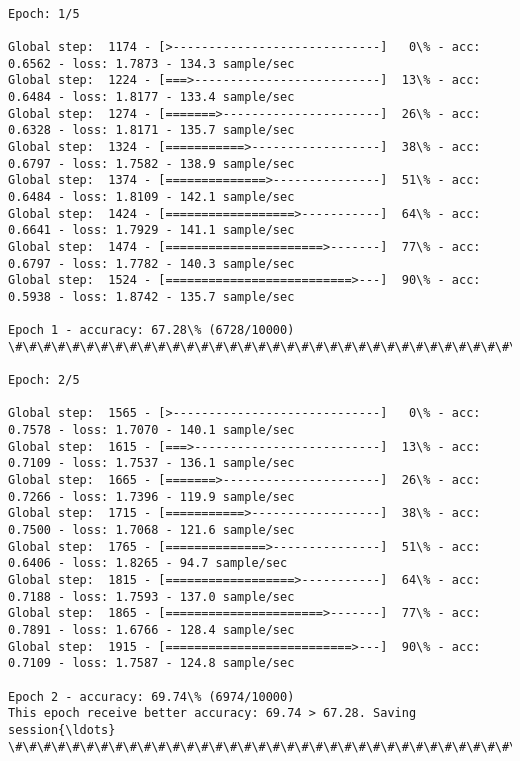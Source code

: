 \documentclass[11pt]{article}
\begin{document}
    \begin{Verbatim}[commandchars=\\\{\}]

Epoch: 1/5

Global step:  1174 - [>-----------------------------]   0\% - acc: 0.6562 - loss: 1.7873 - 134.3 sample/sec
Global step:  1224 - [===>--------------------------]  13\% - acc: 0.6484 - loss: 1.8177 - 133.4 sample/sec
Global step:  1274 - [=======>----------------------]  26\% - acc: 0.6328 - loss: 1.8171 - 135.7 sample/sec
Global step:  1324 - [===========>------------------]  38\% - acc: 0.6797 - loss: 1.7582 - 138.9 sample/sec
Global step:  1374 - [==============>---------------]  51\% - acc: 0.6484 - loss: 1.8109 - 142.1 sample/sec
Global step:  1424 - [==================>-----------]  64\% - acc: 0.6641 - loss: 1.7929 - 141.1 sample/sec
Global step:  1474 - [======================>-------]  77\% - acc: 0.6797 - loss: 1.7782 - 140.3 sample/sec
Global step:  1524 - [==========================>---]  90\% - acc: 0.5938 - loss: 1.8742 - 135.7 sample/sec

Epoch 1 - accuracy: 67.28\% (6728/10000)
\#\#\#\#\#\#\#\#\#\#\#\#\#\#\#\#\#\#\#\#\#\#\#\#\#\#\#\#\#\#\#\#\#\#\#\#\#\#\#\#\#\#\#\#\#\#\#\#\#\#\#\#\#\#\#\#\#\#\#\#\#\#\#\#\#\#\#\#\#\#\#\#\#\#\#\#\#\#\#\#\#\#\#\#\#\#\#\#\#\#\#\#\#\#\#\#\#\#\#\#\#\#\#\#\#\#\#

Epoch: 2/5

Global step:  1565 - [>-----------------------------]   0\% - acc: 0.7578 - loss: 1.7070 - 140.1 sample/sec
Global step:  1615 - [===>--------------------------]  13\% - acc: 0.7109 - loss: 1.7537 - 136.1 sample/sec
Global step:  1665 - [=======>----------------------]  26\% - acc: 0.7266 - loss: 1.7396 - 119.9 sample/sec
Global step:  1715 - [===========>------------------]  38\% - acc: 0.7500 - loss: 1.7068 - 121.6 sample/sec
Global step:  1765 - [==============>---------------]  51\% - acc: 0.6406 - loss: 1.8265 - 94.7 sample/sec
Global step:  1815 - [==================>-----------]  64\% - acc: 0.7188 - loss: 1.7593 - 137.0 sample/sec
Global step:  1865 - [======================>-------]  77\% - acc: 0.7891 - loss: 1.6766 - 128.4 sample/sec
Global step:  1915 - [==========================>---]  90\% - acc: 0.7109 - loss: 1.7587 - 124.8 sample/sec

Epoch 2 - accuracy: 69.74\% (6974/10000)
This epoch receive better accuracy: 69.74 > 67.28. Saving session{\ldots}
\#\#\#\#\#\#\#\#\#\#\#\#\#\#\#\#\#\#\#\#\#\#\#\#\#\#\#\#\#\#\#\#\#\#\#\#\#\#\#\#\#\#\#\#\#\#\#\#\#\#\#\#\#\#\#\#\#\#\#\#\#\#\#\#\#\#\#\#\#\#\#\#\#\#\#\#\#\#\#\#\#\#\#\#\#\#\#\#\#\#\#\#\#\#\#\#\#\#\#\#\#\#\#\#\#\#\#


\end{Verbatim}
\end{document}
